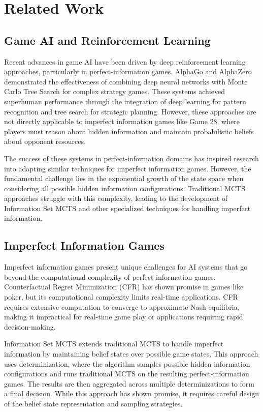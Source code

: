 \documentclass[conference]{IEEEtran}
\begin{document}
\section{Related Work}

\subsection{Game AI and Reinforcement Learning}

Recent advances in game AI have been driven by deep reinforcement learning approaches, particularly in perfect-information games. AlphaGo and AlphaZero demonstrated the effectiveness of combining deep neural networks with Monte Carlo Tree Search for complex strategy games. These systems achieved superhuman performance through the integration of deep learning for pattern recognition and tree search for strategic planning. However, these approaches are not directly applicable to imperfect information games like Game 28, where players must reason about hidden information and maintain probabilistic beliefs about opponent resources.

The success of these systems in perfect-information domains has inspired research into adapting similar techniques for imperfect information games. However, the fundamental challenge lies in the exponential growth of the state space when considering all possible hidden information configurations. Traditional MCTS approaches struggle with this complexity, leading to the development of Information Set MCTS and other specialized techniques for handling imperfect information.

\subsection{Imperfect Information Games}

Imperfect information games present unique challenges for AI systems that go beyond the computational complexity of perfect-information games. Counterfactual Regret Minimization (CFR) has shown promise in games like poker, but its computational complexity limits real-time applications. CFR requires extensive computation to converge to approximate Nash equilibria, making it impractical for real-time game play or applications requiring rapid decision-making.

Information Set MCTS extends traditional MCTS to handle imperfect information by maintaining belief states over possible game states. This approach uses determinization, where the algorithm samples possible hidden information configurations and runs traditional MCTS on the resulting perfect-information games. The results are then aggregated across multiple determinizations to form a final decision. While this approach has shown promise, it requires careful design of the belief state representation and sampling strategies.
\end{document}
